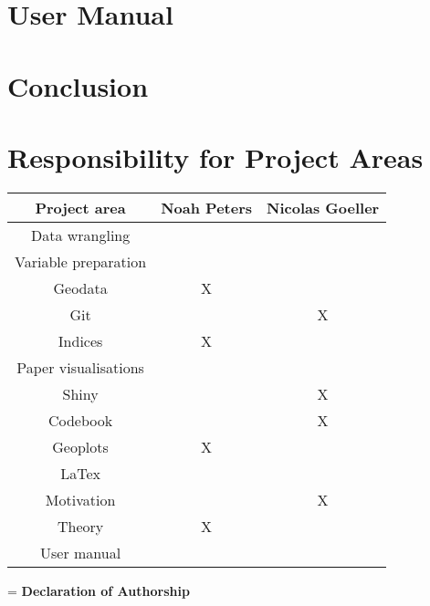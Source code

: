 \documentclass[preprint,12pt,authoryear]{elsarticle}
\begin{document}
\section{User Manual}
	
\section{Conclusion}

	
\newpage
 \appendix
	
\section{Responsibility for Project Areas}

\begin{tabular}{|c|c|c|}
	\hline 
	\textbf{Project area}	& \textbf{Noah Peters} 	& \textbf{Nicolas Goeller} 	\\ 
	\hline 
	Data wrangling			&  		   				&  				 			\\ 
	\hline 
	Variable preparation 	&  		   				&  				 			\\ 
	\hline 
	Geodata					&  		   X			&  				 			\\ 
	\hline 
	Git	     			 	&  		   				&  				X 			\\ 
	\hline 			
	Indices				 	&  		   X			&  				 			\\ 
	\hline 
	Paper visualisations 	&  		   				&  				 			\\ 
	\hline 
	Shiny 				 	&  		   				&  				X 			\\ 
	\hline 
	Codebook 			 	&  		   				&  				X 			\\ 
	\hline 
	Geoplots 			 	&  		   X			&  				 			\\ 
	\hline 
	LaTex				 	&  		   				&  				 			\\ 
	\hline 
	Motivation			 	&  		   				&  				X 			\\ 
	\hline 
	Theory				 	&  		   X			&  				 			\\ 
	\hline 
	User manual			 	&  		   				&  				 			\\ 
	\hline 
\end{tabular}

	\newpage
	 
	
	
	\newpage
	\hangindent=\parindent
	\parindent 0pt
	\textbf{Declaration of Authorship}
	\\
	
\end{document}
